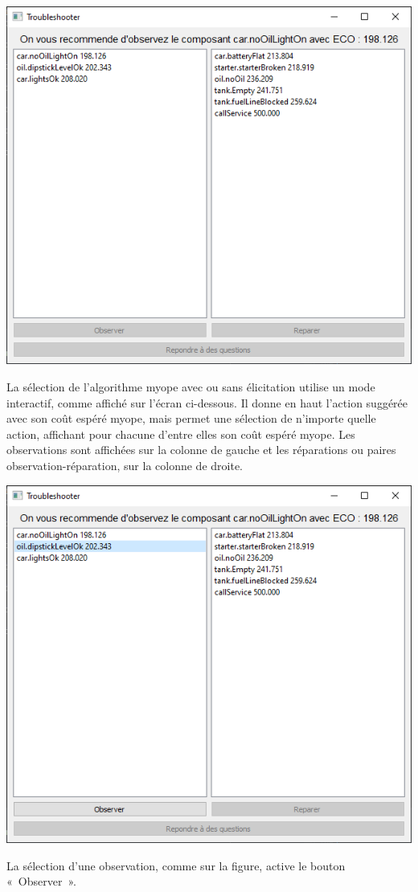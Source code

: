 \documentclass[a4paper,11pt]{article}
\theoremstyle{plain}
\theoremstyle{definition}
\begin{document}
\begin{center}
\includegraphics[scale=0.667]{Figures/myope_1}
\end{center}
La sélection de l'algorithme myope avec ou sans élicitation utilise un mode interactif, comme affiché sur l'écran ci-dessous. Il donne en haut l'action suggérée avec son coût espéré myope, mais permet une sélection de n'importe quelle action, affichant pour chacune d'entre elles son coût espéré myope. Les observations sont affichées sur la colonne de gauche et les réparations ou paires observation-réparation, sur la colonne de droite.

\begin{center}
\includegraphics[scale=0.667]{Figures/myope_2}
\end{center}
La sélection d'une observation, comme sur la figure, active le bouton «~Observer~».
\end{document}
